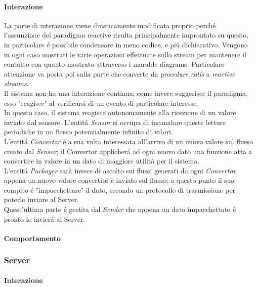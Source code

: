 \paragraph{Interazione} La parte di interazione viene drasticamente modificata proprio perch\'e l'assunzione del paradigma reactive risulta principalmente improntato su questo, in particolare \'e possibile condensare in meno codice, e pi\'u dichiarativo. Vengono in ogni caso mostrati le varie operazioni effettuate sullo stream per mantenere il contatto con quanto mostrato attraverso i marable diagrams. Particolare attenzione va posta poi sulla parte che converte da \textit{procedure calls} a \textit{reactive streams}. \\
Il sistema non ha una interazione continua; come invece suggerisce il paradigma, esso "reagisce" al verificarsi di un evento di particolare interesse.\\
In questo caso, il sistema reagisce autonomamente alla ricezione di un valore inviato dal sensore. L'entit\'a \textit{Sensor} si occupa di incanalare queste letture periodiche in un flusso potenzialmente infinito di valori.\\
L'entit\'a \textit{Convertor} \'e a sua volta interessata all'arrivo di un nuovo valore sul flusso creato dal \textit{Sensor}; il Convertor applicher\'a ad ogni nuovo dato una funzione atta a convertire in valore in un dato di maggiore utilità per il sistema.\\
L'entit\'a \textit{Packager} sarà invece di ascolto sui flussi generati da ogni \textit{Convertor}, appena un nuovo valore convertito è inviato sul flusso; a questo punto il suo compito \'e "impacchettare" il dato, secondo un protocollo di trasmissione per poterlo inviare al Server.\\
Quest'ultima parte \'e gestita dal \textit{Sender} che appena un dato impacchettato \'e pronto lo invier\'a al Server.

\paragraph{Comportamento}

\subsubsection{Server}

\paragraph{Interazione}

